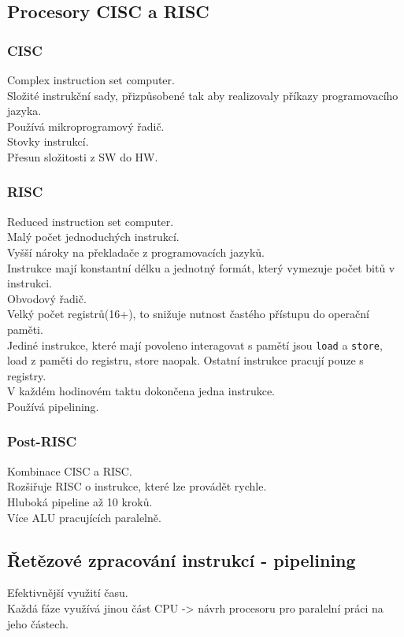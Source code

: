 \subsection{Procesory CISC a RISC}
\subsubsection*{CISC}
Complex instruction set computer. \\
Složité instrukční sady, přizpůsobené tak aby realizovaly příkazy programovacího jazyka. \\
Používá mikroprogramový řadič. \\
Stovky instrukcí. \\
Přesun složitosti z SW do HW. \\

\subsubsection*{RISC}
Reduced instruction set computer. \\
Malý počet jednoduchých instrukcí. \\
Vyšší nároky na překladače z programovacích jazyků. \\
Instrukce mají konstantní délku a jednotný formát, který vymezuje počet bitů v instrukci. \\
Obvodový řadič. \\
Velký počet registrů(16+), to snižuje nutnost častého přístupu do operační paměti. \\
Jediné instrukce, které mají povoleno interagovat s pamětí jsou \texttt{load} a \texttt{store}, load z paměti do registru, store naopak. Ostatní instrukce pracují pouze s registry.\\
V každém hodinovém taktu dokončena jedna instrukce. \\
Používá pipelining. \\

\subsubsection*{Post-RISC}
Kombinace CISC a RISC. \\
Rozšiřuje RISC o instrukce, které lze provádět rychle. \\
Hluboká pipeline až 10 kroků. \\
Více ALU pracujících paralelně. \\

\subsection{Řetězové zpracování instrukcí - pipelining}
Efektivnější využití času. \\
Každá fáze využívá jinou část CPU -> návrh procesoru pro paralelní práci na jeho částech. \\

